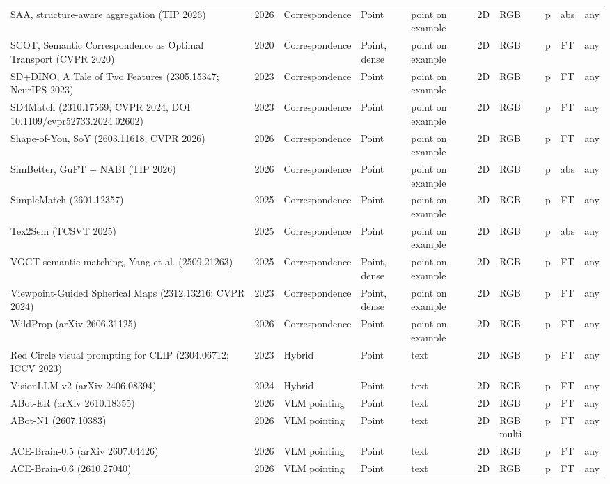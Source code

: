 {\begin{landscape}
\begin{longtable}{@{}p{4.6cm}rp{2.0cm}lllllcl@{}}
SAA, structure-aware aggregation (TIP 2026) & 2026 & Correspondence & Point & point on example & 2D & RGB & p & abs & any \\
SCOT, Semantic Correspondence as Optimal Transport (CVPR 2020) & 2020 & Correspondence & Point, dense & point on example & 2D & RGB & p & FT & any \\
SD+DINO, A Tale of Two Features (2305.15347; NeurIPS 2023) & 2023 & Correspondence & Point & point on example & 2D & RGB & p & FT & any \\
SD4Match (2310.17569; CVPR 2024, DOI 10.1109/cvpr52733.2024.02602) & 2023 & Correspondence & Point & point on example & 2D & RGB & p & FT & any \\
Shape-of-You, SoY (2603.11618; CVPR 2026) & 2026 & Correspondence & Point & point on example & 2D & RGB & p & FT & any \\
SimBetter, GuFT + NABI (TIP 2026) & 2026 & Correspondence & Point & point on example & 2D & RGB & p & abs & any \\
SimpleMatch (2601.12357) & 2025 & Correspondence & Point & point on example & 2D & RGB & p & FT & any \\
Tex2Sem (TCSVT 2025) & 2025 & Correspondence & Point & point on example & 2D & RGB & p & abs & any \\
VGGT semantic matching, Yang et al. (2509.21263) & 2025 & Correspondence & Point, dense & point on example & 2D & RGB & p & FT & any \\
Viewpoint-Guided Spherical Maps (2312.13216; CVPR 2024) & 2023 & Correspondence & Point, dense & point on example & 2D & RGB & p & FT & any \\
WildProp (arXiv 2606.31125) & 2026 & Correspondence & Point & point on example & 2D & RGB & p & FT & any \\
Red Circle visual prompting for CLIP (2304.06712; ICCV 2023) & 2023 & Hybrid & Point & text & 2D & RGB & p & FT & any \\
VisionLLM v2 (arXiv 2406.08394) & 2024 & Hybrid & Point & text & 2D & RGB & p & FT & any \\
ABot-ER (arXiv 2610.18355) & 2026 & VLM pointing & Point & text & 2D & RGB & p & FT & any \\
ABot-N1 (2607.10383) & 2026 & VLM pointing & Point & text & 2D & RGB multi & p & FT & any \\
ACE-Brain-0.5 (arXiv 2607.04426) & 2026 & VLM pointing & Point & text & 2D & RGB & p & FT & any \\
ACE-Brain-0.6 (2610.27040) & 2026 & VLM pointing & Point & text & 2D & RGB & p & FT & any \\

\end{longtable}
\end{landscape}}
